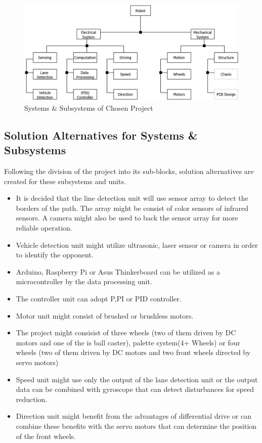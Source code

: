 \documentclass[a4paper,12pt]{article}
\begin{document}
	
	\begin{figure}[H]
		\centering
		\includegraphics[width=\textwidth,height=\textheight,keepaspectratio]{product-tree/product-tree} 
		\caption{\label{fig:systems_project}Systems \& Subsystems of Chosen Project}
	\end{figure}

	\subsection{Solution Alternatives for Systems \& Subsystems }
	
	Following the division of the project into its sub-blocks, solution alternatives are created for these subsystems and units. 
		
	\begin{itemize}
		\item It is decided that the line detection unit will use sensor array to detect the borders of the path. The array might be consist of color sensors of infrared sensors. A camera might also be used to back the sensor array for more reliable operation.	
		\item Vehicle detection unit might utilize ultrasonic, laser sensor or camera in order to identify the opponent.
		\item  Arduino, Raspberry Pi or Asus Thinkerboard can be utilized as a microcontroller by the data processing unit.
		\item The controller unit can adopt P,PI or PID controller.
		\item Motor unit might consist of brushed or brushless motors.
		\item The project might consisist of three wheels (two of them driven by DC motors and one of the is ball caster), palette system(4+ Wheels) or four wheels (two of them driven by DC motors and two front wheels directed by servo motors)
		\item Speed unit might use only the output of the lane detection unit or the output data can be combined with gyroscope that can detect disturbances for speed reduction.  
		\item Direction unit might benefit from the advantages of differential drive or can combine these benefits with the servo motors that can determine the position of the front wheels.
	\end{itemize}	  
			
\end{document}

